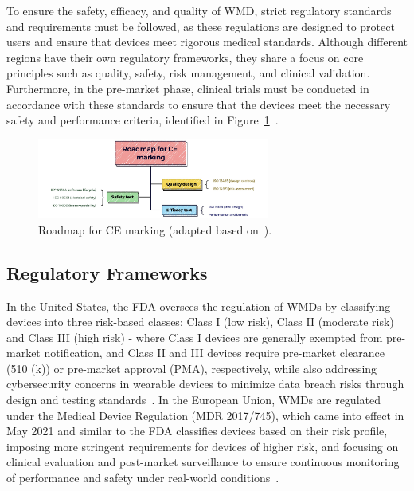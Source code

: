 \documentclass[journal]{IEEEtran}
\begin{document}
To ensure the safety, efficacy, and quality of WMD, strict regulatory standards and requirements must be followed, as these regulations are designed to protect users and ensure that devices meet rigorous medical standards. Although different regions have their own regulatory frameworks, they share a focus on core principles such as quality, safety, risk management, and clinical validation. Furthermore, in the pre-market phase, clinical trials must be conducted in accordance with these standards to ensure that the devices meet the necessary safety and performance criteria, identified in Figure~\ref{fig:roadmap}~\cite{Dias2018,Ravizza2019,EuropeanUnion2024}.

\begin{figure}[ht]
\centering
\includegraphics[width=3in]{Wearables_SEB_2024-2025_Group1/Figuras/Roadmap for CE marking.jpeg}
\caption{Roadmap for CE marking (adapted based on~\cite{Ravizza2019}).}
\label{fig:roadmap}
\end{figure}

    \subsection{Regulatory Frameworks}


    In the United States, the FDA oversees the regulation of WMDs by classifying devices into three risk-based classes: Class I (low risk), Class II (moderate risk) and Class III (high risk) - where Class I devices are generally exempted from pre-market notification, and Class II and III devices require pre-market clearance (510 (k)) or pre-market approval (PMA), respectively, while also addressing cybersecurity concerns in wearable devices to minimize data breach risks through design and testing standards~\cite{Dias2018,Ravizza2019,FDA2016,FDA2023}. In the European Union, WMDs are regulated under the Medical Device Regulation (MDR 2017/745), which came into effect in May 2021 and similar to the FDA classifies devices based on their risk profile, imposing more stringent requirements for devices of higher risk, and focusing on clinical evaluation and post-market surveillance to ensure continuous monitoring of performance and safety under real-world conditions~\cite{EuropeanUnion2024}.
\end{document}
